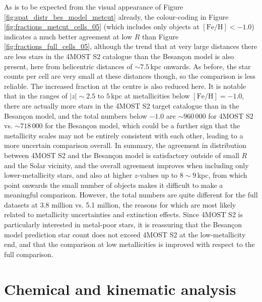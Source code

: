 \documentclass[a4paper,11pt]{article}
\begin{document}
As is to be expected from the visual appearance of Figure \ref{fig:spat_distr_bes_model_metcut} already, the colour-coding in Figure \ref{fig:fractions_metcut_cells_05} (which includes only objects at $\mathrm{[Fe/H]}<-1.0$) indicates a much better agreement at low $R$ than Figure \ref{fig:fractions_full_cells_05}, although the trend that at very large distances there are less stars in the 4MOST S2 catalogue than the Besan\c{c}on model is also present, here from helicentric distances of ${\sim}7.5$\,kpc onwards. As before, the star counts per cell are very small at these distances though, so the comparison is less reliable. The increased fraction at the centre is also reduced here. It is notable that in the ranges of $|z|\sim2.5$ to $5$\,kpc at metallicities below $\mathrm{[Fe/H]}=-1.0$, there are actually more stars in the 4MOST S2 target catalogue than in the Besan\c{c}on model, and the total numbers below $-1.0$ are ${\sim}960\,000$ for 4MOST S2 vs. ${\sim}718\,000$ for the Besan\c{c}on model, which could be a further sign that the metallicity scales may not be entirely consistent with each other, leading to a more uncertain comparison overall. In summary, the agreement in distribution between 4MOST S2 and the Besan\c{c}on model is satisfactory outside of small $R$ and the Solar vicinity, and the overall agreement improves when including only lower-metallicity stars, and also at higher $z$-values up to $8{\sim}9$\,kpc, from which point onwards the small number of objects makes it difficult to make a meaningful comparison. However, the total numbers are quite different for the full datasets at 3.8 million vs. 5.1 million, the reasons for which are most likely related to metallicity uncertainties and extinction effects. Since 4MOST S2 is particularly interested in metal-poor stars, it is reassuring that the Besan\c{c}on model prediction star count does not exceed 4MOST S2 at the low-metallicity end, and that the comparison at low metallicities is improved with respect to the full comparison.
%
%
%
%
%
\clearpage
\section{Chemical and kinematic analysis} \label{kinematics}
\end{document}

